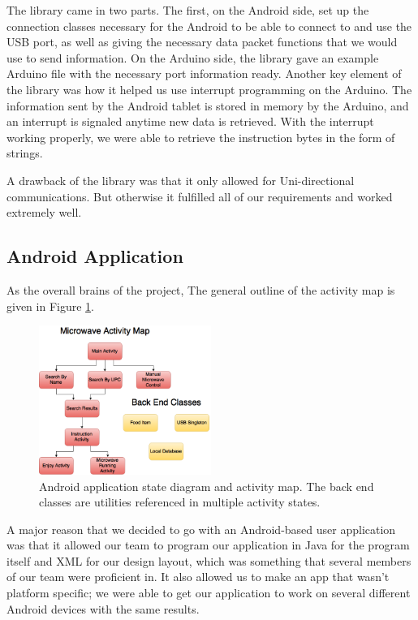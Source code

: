 \documentclass[10pt,journal,letterpaper,twocolumn]{IEEEtran}
\begin{document}
The library came in two parts.  The first, on the Android side, set up the connection classes necessary for the Android to be able to connect to and use the USB port, as well as giving the necessary data packet functions that we would use to send information.  On the Arduino side, the library gave an example Arduino file with the necessary port information ready.  Another key element of the library was how it helped us use interrupt programming on the Arduino.  The information sent by the Android tablet is stored in memory by the Arduino, and an interrupt is signaled anytime new data is retrieved.  With the interrupt working properly, we were able to retrieve the instruction bytes in the form of strings.

A drawback of the library was that it only allowed for Uni-directional communications.  But otherwise it fulfilled all of our requirements and worked extremely well.

\subsection*{Android Application}

As the overall brains of the project, The general outline of the activity map is given in Figure \ref{fig:activitymap}.

\begin{figure}[ht]
\centering
\includegraphics[width=0.5\textwidth]{MicrowaveActivityMap.png}
\caption{\label{fig:activitymap}Android application state diagram and activity map. The back end classes are utilities referenced in multiple activity states.}
\end{figure}

  A major reason that we decided to go with an Android-based user application was that it allowed our team to program our application in Java for the program itself and XML for our design layout, which was something that several members of our team were proficient in.  It also allowed us to make an app that wasn't platform specific; we were able to get our application to work on several different Android devices with the same results.
  
\end{document}
